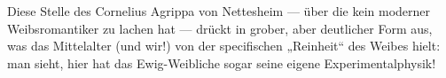   Diese Stelle des Cornelius Agrippa von Nettesheim — über die kein moderner Weibsromantiker zu lachen hat — drückt in grober, aber deutlicher Form aus, was das Mittelalter (und wir!) von der specifischen „Reinheit“ des Weibes hielt: man sieht, hier hat das Ewig-Weibliche sogar seine eigene Experimentalphysik!
\par


